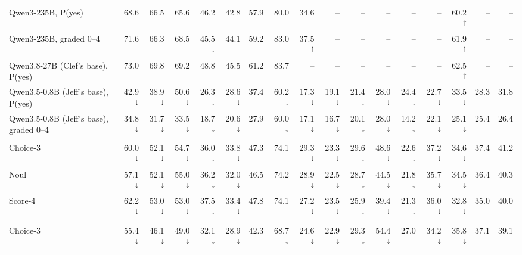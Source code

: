 \begin{table}
\begin{tabular}{lrrrrr|r|rrrrrrrr|r|r}
Qwen3-235B, P(yes) & 68.6 & 66.5 & 65.6 & 46.2 & 42.8 & 57.9 & 80.0 & 34.6 & -- & -- & -- & -- & -- & 60.2$^\uparrow$ & -- & -- \\
Qwen3-235B, graded 0--4 & 71.6 & 66.3 & 68.5 & 45.5$^\downarrow$ & 44.1 & 59.2 & 83.0 & 37.5$^\uparrow$ & -- & -- & -- & -- & -- & 61.9$^\uparrow$ & -- & -- \\
Qwen3.8-27B (Clef's base), P(yes) & 73.0 & 69.8 & 69.2 & 48.8 & 45.5 & 61.2 & 83.7 & -- & -- & -- & -- & -- & -- & 62.5$^\uparrow$ & -- & -- \\
Qwen3.5-0.8B (Jeff's base), P(yes) & 42.9$^\downarrow$ & 38.9$^\downarrow$ & 50.6$^\downarrow$ & 26.3$^\downarrow$ & 28.6$^\downarrow$ & 37.4 & 60.2$^\downarrow$ & 17.3$^\downarrow$ & 19.1$^\downarrow$ & 21.4$^\downarrow$ & 28.0$^\downarrow$ & 24.4$^\downarrow$ & 22.7$^\downarrow$ & 33.5$^\downarrow$ & 28.3 & 31.8 \\
Qwen3.5-0.8B (Jeff's base), graded 0--4 & 34.8$^\downarrow$ & 31.7$^\downarrow$ & 33.5$^\downarrow$ & 18.7$^\downarrow$ & 20.6$^\downarrow$ & 27.9 & 60.0$^\downarrow$ & 17.1$^\downarrow$ & 16.7$^\downarrow$ & 20.1$^\downarrow$ & 28.0$^\downarrow$ & 14.2$^\downarrow$ & 22.1$^\downarrow$ & 25.1$^\downarrow$ & 25.4 & 26.4 \\
\addlinespace[1pt]
\multicolumn{17}{l}{\textit{Laya (421M)}} \\
\quad Choice-3 & 60.0$^\downarrow$ & 52.1$^\downarrow$ & 54.7$^\downarrow$ & 36.0$^\downarrow$ & 33.8$^\downarrow$ & 47.3 & 74.1 & 29.3$^\downarrow$ & 23.3$^\downarrow$ & 29.6$^\downarrow$ & 48.6$^\downarrow$ & 22.6$^\downarrow$ & 37.2$^\downarrow$ & 34.6$^\downarrow$ & 37.4 & 41.2 \\
\quad Noul & 57.1$^\downarrow$ & 52.1$^\downarrow$ & 55.0$^\downarrow$ & 36.2$^\downarrow$ & 32.0$^\downarrow$ & 46.5 & 74.2 & 28.9$^\downarrow$ & 22.5$^\downarrow$ & 28.7$^\downarrow$ & 44.5$^\downarrow$ & 21.8$^\downarrow$ & 35.7$^\downarrow$ & 34.5$^\downarrow$ & 36.4 & 40.3 \\
\quad Score-4 & 62.2$^\downarrow$ & 53.0$^\downarrow$ & 53.0$^\downarrow$ & 37.5$^\downarrow$ & 33.4$^\downarrow$ & 47.8 & 74.1 & 27.2$^\downarrow$ & 23.5$^\downarrow$ & 25.9$^\downarrow$ & 39.4$^\downarrow$ & 21.3$^\downarrow$ & 36.0$^\downarrow$ & 32.8$^\downarrow$ & 35.0 & 40.0 \\
\addlinespace[1pt]
\multicolumn{17}{l}{\textit{Jeff (0.8B)}} \\
\quad Choice-3 & 55.4$^\downarrow$ & 46.1$^\downarrow$ & 49.0$^\downarrow$ & 32.1$^\downarrow$ & 28.9$^\downarrow$ & 42.3 & 68.7$^\downarrow$ & 24.6$^\downarrow$ & 22.9$^\downarrow$ & 29.3$^\downarrow$ & 54.4$^\downarrow$ & 27.0 & 34.2$^\downarrow$ & 35.8$^\downarrow$ & 37.1 & 39.1 \\

\end{tabular}
\end{table}
